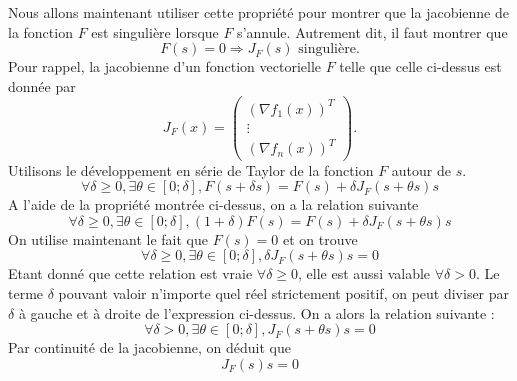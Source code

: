 Nous allons maintenant utiliser cette propriété pour montrer que la jacobienne de la fonction $F$ est singulière lorsque $F$ s'annule. Autrement dit, il faut montrer que $$F(s) = 0 \Rightarrow J_{F}(s) \text{ singulière}.$$
Pour rappel, la jacobienne d'un fonction vectorielle $F$ telle que celle ci-dessus est donnée par 
$$J_F(x) =
\left(\begin{array}{c}
(\nabla f_1(x))^T \\
\vdots \\
(\nabla f_n(x))^T
\end{array}\right).$$
Utilisons le développement en série de Taylor de la fonction $F$ autour de $s$.\\
$$\forall \delta \geq 0, \exists \theta \in [0;\delta], F(s+\delta s) = F(s) + \delta J_F(s+\theta s)s$$
A l'aide de la propriété montrée ci-dessus, on a la relation suivante  $$\forall \delta \geq 0, \exists \theta \in [0;\delta], (1+\delta)F(s) = F(s) + \delta J_F(s+\theta s)s$$
On utilise maintenant le fait que $F(s) = 0$ et on trouve $$\forall \delta \geq 0, \exists \theta \in [0;\delta], \delta J_F(s+\theta s)s = 0$$
Etant donné que cette relation est vraie $\forall \delta \geq 0$, elle est aussi valable $\forall \delta > 0$. Le terme $\delta$ pouvant valoir n'importe quel réel strictement positif, on peut diviser par $\delta$ à gauche et à droite de l'expression ci-dessus. On a alors la relation suivante : $$\forall \delta > 0, \exists \theta \in [0;\delta], J_F(s+\theta s)s = 0$$
Par continuité de la jacobienne, on déduit que $$J_F(s)s = 0$$
